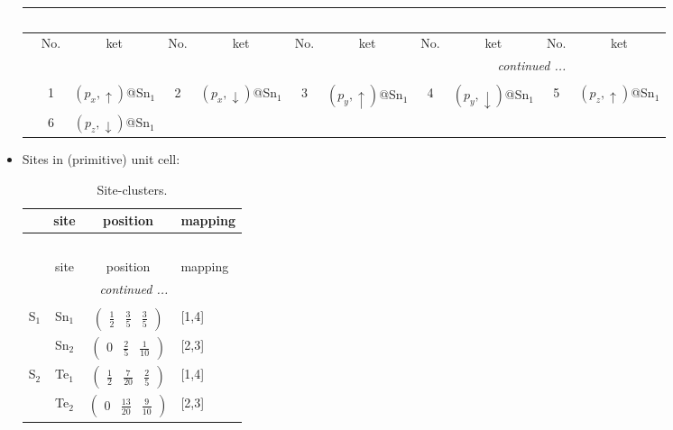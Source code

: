 \documentclass[fleqn,10pt,landscape]{article}
\begin{document}
\begin{itemize}
\begin{center}
\begin{longtable}{c|cc|cc|cc|cc|cc}
\multicolumn{10}{l}{\tablename\ \thetable{}} \\
 \hline \hline
 & No. & ket & No. & ket & No. & ket & No. & ket & No. & ket \\ \hline \endhead

 \hline \hline
\multicolumn{10}{r}{\footnotesize\it continued ...} \\ \endfoot

 \hline \hline
\multicolumn{10}{r}{} \\ \endlastfoot

 & 1 & $(p_{x},\uparrow)$@Sn$_{1}$ & 2 & $(p_{x},\downarrow)$@Sn$_{1}$ & 3 & $(p_{y},\uparrow)$@Sn$_{1}$ & 4 & $(p_{y},\downarrow)$@Sn$_{1}$ & 5 & $(p_{z},\uparrow)$@Sn$_{1}$ \\
& 6 & $(p_{z},\downarrow)$@Sn$_{1}$ &  &  &  &  &  &  &  &  \\
\end{longtable}
\end{center}

\item Sites in (primitive) unit cell:
\begin{center}
\renewcommand{\arraystretch}{1.3}
\begin{longtable}{cc|c|l}
\caption{Site-clusters.}
 \\
 \hline \hline
 & site & position & mapping \\ \hline \endfirsthead

\multicolumn{3}{l}{\tablename\ \thetable{}} \\
 \hline \hline
 & site & position & mapping \\ \hline \endhead

 \hline \hline
\multicolumn{3}{r}{\footnotesize\it continued ...} \\ \endfoot

 \hline \hline
\multicolumn{3}{r}{} \\ \endlastfoot

S$_{1}$ & Sn$_1$ & $\begin{pmatrix} \frac{1}{2} & \frac{3}{5} & \frac{3}{5} \end{pmatrix}$ & [1,4] \\
& Sn$_2$ & $\begin{pmatrix} 0 & \frac{2}{5} & \frac{1}{10} \end{pmatrix}$ & [2,3] \\ \hline
S$_{2}$ & Te$_1$ & $\begin{pmatrix} \frac{1}{2} & \frac{7}{20} & \frac{2}{5} \end{pmatrix}$ & [1,4] \\
& Te$_2$ & $\begin{pmatrix} 0 & \frac{13}{20} & \frac{9}{10} \end{pmatrix}$ & [2,3] \\
\end{longtable}
\end{center}


\end{itemize}
\end{document}
